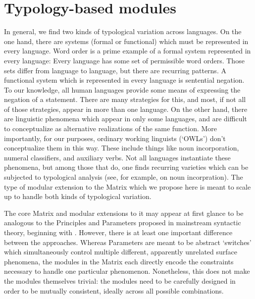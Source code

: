 \documentclass[11pt]{article}
\begin{document}
\section{Typology-based modules}

In general, we find two kinds of typological variation across
languages.  On the one hand, there are systems (formal or functional)
which must be represented in every language.  Word order is a prime
example of a formal system represented in every language: Every
language has some set of permissible word orders.  Those sets differ
from language to language, but there are recurring patterns.
A functional system which is represented in every language is
sentential negation.  To our knowledge, all human languages provide
some means of expressing the negation of a statement.  There are many
strategies for this, and most, if not all of those strategies, appear
in more than one language.  On the other hand, there are linguistic
phenomena which appear in only some languages, and are difficult to
conceptualize as alternative realizations of the same function.  More
importantly, for our purposes, ordinary working linguists (`OWLs')
don't conceptualize them in this way.  These include things like
noun incorporation, numeral classifiers, and auxiliary verbs.
Not all languages instantiate these phenomena, but among those that
do, one finds recurring varieties which can be subjected to typological
analysis (see, for example, \cite{Mithun:84} on noun incorpration).
The type of modular extension to the Matrix which we propose here
is meant to scale up to handle both kinds of typological variation.

The core Matrix and modular extensions to it may appear at first
glance to be analogous to the Principles and Parameters proposed
in mainstream syntactic theory, beginning with .
However, there is at least one important difference between the
approaches.  Whereas Parameters are meant to be abstract `switches'
which simultaneously control multiple different, apparently 
unrelated surface phenomena, the modules in the Matrix each directly
encode the constraints necessary to handle one particular phenomenon.
Nonetheless, this does not make the modules themselves trivial:
the modules need to be carefully designed in order to be mutually
consistent, ideally across all possible combinations.  
\end{document}
